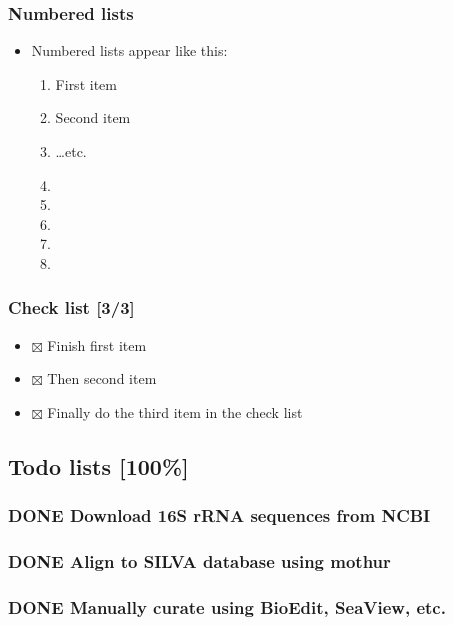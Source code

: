 \documentclass[a4paper, twoside]{article}
\begin{document}
\subsubsection{Numbered lists}
\label{sec:orgcd7951e}
\begin{itemize}
\item Numbered lists appear like this:
\begin{enumerate}
\item First item
\item Second item
\item \ldots{}etc.
\item 

\item 

\item 

\item 

\item 
\end{enumerate}
\end{itemize}
\subsubsection{Check list [3/3]}
\label{sec:org24db8e2}
\begin{itemize}
\item $\boxtimes$ Finish first item
\item $\boxtimes$ Then second item
\item $\boxtimes$ Finally do the third item in the check list
\end{itemize}
\subsection{Todo lists [100\%]}
\label{sec:org7d0e6ef}
\subsubsection{{\bfseries\sffamily DONE} Download 16S rRNA sequences from NCBI}
\label{sec:orgb3ea7c0}
\subsubsection{{\bfseries\sffamily DONE} Align to SILVA database using mothur}
\label{sec:org4a3e16d}
\subsubsection{{\bfseries\sffamily DONE} Manually curate using BioEdit, SeaView, etc.}
\label{sec:org51a675}
\end{document}

